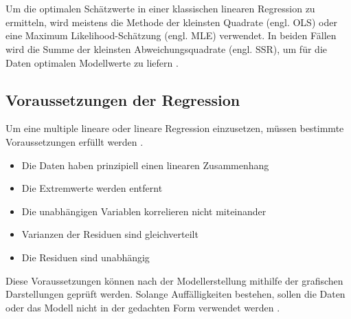 \\\\
Um die optimalen Schätzwerte in einer klassischen linearen Regression zu ermitteln, wird meistens die Methode der kleinsten Quadrate (engl. \ac{OLS}) oder eine Maximum Likelihood-Schätzung (engl. \ac{MLE}) verwendet. In beiden Fällen wird die Summe der kleinsten Abweichungsquadrate (engl. \ac{SSR}), um für die Daten optimalen Modellwerte zu liefern \cite[S. 246]{frick2021data}. 
\subsection{Voraussetzungen der Regression}
Um eine multiple lineare oder lineare Regression einzusetzen, müssen bestimmte Voraussetzungen erfüllt werden \cite{akinkunmi2018data}. 
\begin{itemize}
    \item Die Daten haben prinzipiell einen linearen Zusammenhang
    \item Die Extremwerte werden entfernt
    \item Die unabhängigen Variablen korrelieren nicht miteinander
    \item Varianzen der Residuen sind gleichverteilt
    \item Die Residuen sind unabhängig
\end{itemize}
Diese Voraussetzungen können nach der Modellerstellung mithilfe der grafischen Darstellungen geprüft werden. Solange Auffälligkeiten bestehen, sollen die Daten oder das Modell nicht in der gedachten Form verwendet werden \cite{akinkunmi2018data}. 
